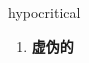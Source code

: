 
\begin{frame}
{\huge hypocritical}
\begin{center}
\begin{enumerate}\Large
  \item \textbf{虚伪的}
\end{enumerate}
\end{center}
\end{frame}
